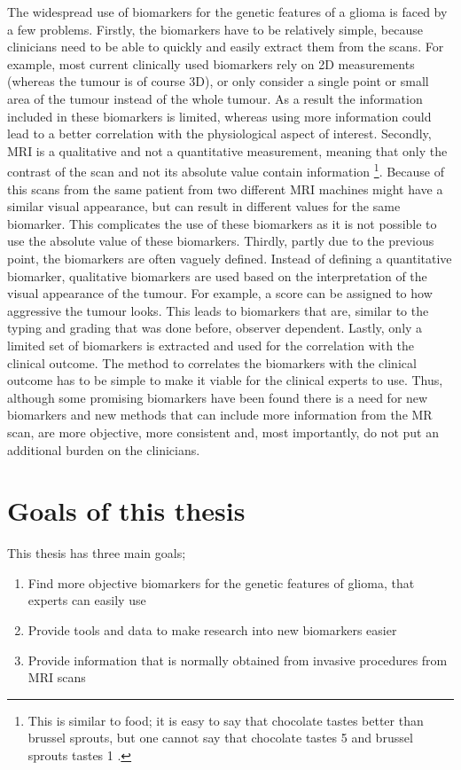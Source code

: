 The widespread use of biomarkers for the genetic features of a glioma is faced by a few problems.
Firstly, the biomarkers have to be relatively simple, because clinicians need to be able to quickly and easily extract them from the scans.
For example, most current clinically used biomarkers rely on 2D measurements (whereas the tumour is of course 3D), or only consider a single point or small area of the tumour instead of the whole tumour.
As a result the information included in these biomarkers is limited, whereas using more information could lead to a better correlation with the physiological aspect of interest.
Secondly, \gls{MRI} is a qualitative and not a quantitative measurement, meaning that only the contrast of the scan and not its absolute value contain information \footnote{This is similar to food; it is easy to say that chocolate tastes better than brussel sprouts, but one cannot say that chocolate tastes 5  and brussel sprouts tastes 1 .}.
Because of this scans from the same patient from two different \gls{MRI} machines might have a similar visual appearance, but can result in different values for the same biomarker.
This complicates the use of these biomarkers as it is not possible to use the absolute value of these biomarkers.
Thirdly, partly due to the previous point, the biomarkers are often vaguely defined.
Instead of defining a quantitative biomarker, qualitative biomarkers are used based on the interpretation of the visual appearance of the tumour.
For example, a score can be assigned to how aggressive the tumour looks.
This leads to biomarkers that are, similar to the typing and grading that was done before, observer dependent.
Lastly, only a limited set of biomarkers is extracted and used for the correlation with the clinical outcome.
The method to correlates the biomarkers with the clinical outcome has to be simple to make it viable for the clinical experts to use.
Thus, although some promising biomarkers have been found there is a need for new biomarkers and new methods that can include more information from the \gls{MR} scan, are more objective, more consistent and, most importantly, do not put an additional burden on the clinicians.


\section{Goals of this thesis}

This thesis has three main goals;

\begin{enumerate}
\item Find more objective biomarkers for the genetic features of glioma, that experts can easily use
\item Provide tools and data to make research into new biomarkers easier
\item Provide information that is normally obtained from invasive procedures from \gls{MRI} scans
\end{enumerate}

